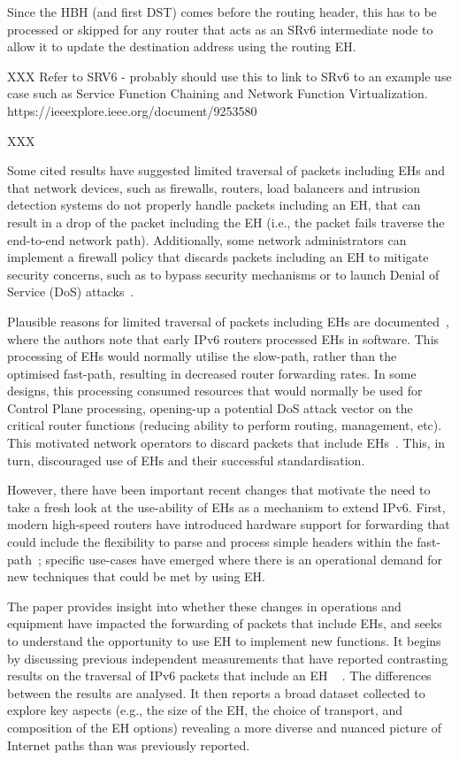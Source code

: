 \documentclass[conference]{IEEEtran}
\begin{document}
Since the HBH (and first DST) comes before the routing header, this has to be processed or skipped for any router that acts as an SRv6 intermediate node to allow it to update the destination address using the routing EH.

XXX
Refer to SRV6
- probably should use this to link to SRv6 to an example use  case such as Service Function Chaining and Network Function Virtualization.
https://ieeexplore.ieee.org/document/9253580

XXX

Some cited results have suggested limited traversal of packets including EHs and that network devices, such as firewalls, routers, load balancers and intrusion detection systems do not properly handle packets including an EH, that can result in a drop of the packet including the EH (i.e., the packet fails traverse the end-to-end network path).
Additionally, some network administrators can implement a firewall policy that discards packets including an EH to mitigate security concerns, such as to bypass
security mechanisms or to launch Denial of Service (DoS) attacks~\cite{naagas2021deh}.

Plausible reasons for limited traversal of packets including EHs are documented~\cite{ietf-v6ops-HBH-03}, where the authors note that early IPv6 routers
processed EHs in software. This processing of EHs would normally utilise the slow-path, rather than the optimised fast-path, resulting in decreased router forwarding rates. In some designs, this processing consumed resources that would normally be used for Control Plane processing, opening-up a potential DoS attack vector on the critical router functions (reducing ability to perform routing, management, etc). This motivated network operators to discard packets that include EHs~\cite{rfc9098}.  This, in turn,
discouraged use of EHs and their successful standardisation. 

However, there have been important recent changes that motivate the need to take a fresh look at the use-ability of EHs as a mechanism to extend IPv6. First, modern high-speed routers have introduced hardware support for forwarding that could include the flexibility to parse and process simple headers within the fast-path~\cite{cisco-silicon-one}; specific use-cases have emerged where there is an operational demand for new techniques that could be met by using EH.


The paper provides insight into whether these changes in operations and equipment have impacted the forwarding of packets that include EHs, and seeks to understand the opportunity to use EH to implement new functions. It begins by discussing previous independent measurements that have reported contrasting results on the traversal of IPv6 packets that include an EH ~\cite{RFC7872} \cite{apnic} \cite{nalini-iepg114} \cite{james}. The differences between the results are analysed.
It then reports a broad dataset collected to explore key aspects (e.g., the size of the EH, the choice of transport, and composition of the EH options) revealing a more diverse and nuanced picture of Internet paths than was previously reported.
\end{document}
